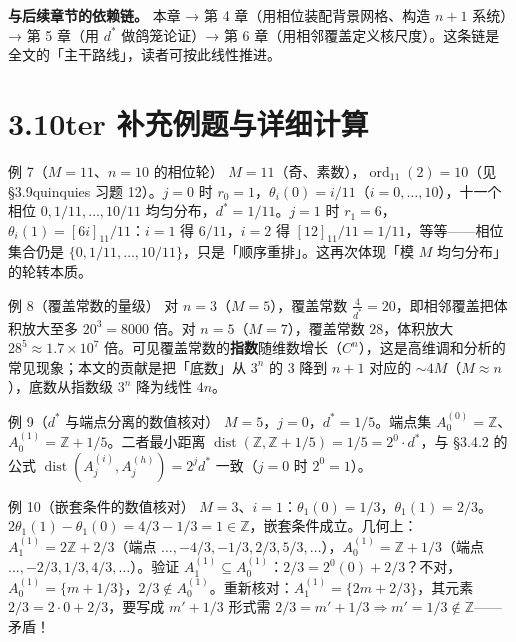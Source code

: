 \documentclass[a4paper,11pt,openany]{ctexbook}
\numberwithin{equation}{chapter}
\numberwithin{figure}{chapter}
\numberwithin{table}{chapter}
\begin{document}
\textbf{与后续章节的依赖链。} 本章 → 第 4 章（用相位装配背景网格、构造 $n+1$ 系统）→ 第 5 章（用 $d^*$ 做鸽笼论证）→ 第 6 章（用相邻覆盖定义核尺度）。这条链是全文的「主干路线」，读者可按此线性推进。

\section{3.10ter 补充例题与详细计算}

\begin{examplebox}{例 7（$M=11$、$n=10$ 的相位轮）}
$M=11$（奇、素数），$\operatorname{ord}_{11}(2)=10$（见 §3.9quinquies 习题 12）。$j=0$ 时 $r_0=1$，$\theta_i(0)=i/11$（$i=0,\dots,10$），十一个相位 $0,1/11,\dots,10/11$ 均匀分布，$d^*=1/11$。$j=1$ 时 $r_1=6$，$\theta_i(1)=[6i]_{11}/11$：$i=1$ 得 $6/11$，$i=2$ 得 $[12]_{11}/11=1/11$，等等——相位集合仍是 $\{0,1/11,\dots,10/11\}$，只是「顺序重排」。这再次体现「模 $M$ 均匀分布」的轮转本质。
\end{examplebox}

\begin{examplebox}{例 8（覆盖常数的量级）}
对 $n=3$（$M=5$），覆盖常数 $\frac4{d^*}=20$，即相邻覆盖把体积放大至多 $20^3=8000$ 倍。对 $n=5$（$M=7$），覆盖常数 $28$，体积放大 $28^5\approx1.7\times10^7$ 倍。可见覆盖常数的\textbf{指数}随维数增长（$C^n$），这是高维调和分析的常见现象；本文的贡献是把「底数」从 $3^n$ 的 $3$ 降到 $n+1$ 对应的 $\sim4M$（$M\approx n$），底数从指数级 $3^n$ 降为线性 $4n$。
\end{examplebox}

\begin{examplebox}{例 9（$d^*$ 与端点分离的数值核对）}
$M=5$，$j=0$，$d^*=1/5$。端点集 $A_0^{(0)}=\mathbb Z$、$A_0^{(1)}=\mathbb Z+1/5$。二者最小距离 $\operatorname{dist}(\mathbb Z,\mathbb Z+1/5)=1/5=2^0\cdot d^*$，与 §3.4.2 的公式 $\operatorname{dist}(A_j^{(i)},A_j^{(h)})=2^j d^*$ 一致（$j=0$ 时 $2^0=1$）。
\end{examplebox}

\begin{examplebox}{例 10（嵌套条件的数值核对）}
$M=3$、$i=1$：$\theta_1(0)=1/3$，$\theta_1(1)=2/3$。$2\theta_1(1)-\theta_1(0)=4/3-1/3=1\in\mathbb Z$，嵌套条件成立。几何上：$A_1^{(1)}=2\mathbb Z+2/3$（端点 $\dots,-4/3,-1/3,2/3,5/3,\dots$），$A_0^{(1)}=\mathbb Z+1/3$（端点 $\dots,-2/3,1/3,4/3,\dots$）。验证 $A_1^{(1)}\subseteq A_0^{(1)}$：$2/3=2^0(0)+2/3$？不对，$A_0^{(1)}=\{m+1/3\}$，$2/3\notin A_0^{(1)}$。重新核对：$A_1^{(1)}=\{2m+2/3\}$，其元素 $2/3=2\cdot0+2/3$，要写成 $m'+1/3$ 形式需 $2/3=m'+1/3\Rightarrow m'=1/3\notin\mathbb Z$——矛盾！
\end{examplebox}
\end{document}
